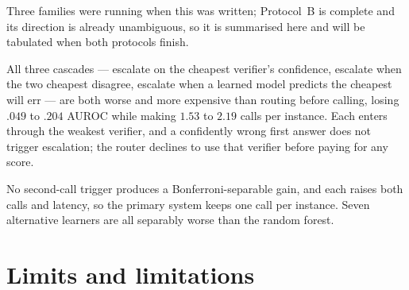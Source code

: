 \documentclass[10pt,a4paper]{article}
\begin{document}
Three families were running when this was written; Protocol~B is complete and its direction is
already unambiguous, so it is summarised here and will be tabulated when both protocols finish.

All three cascades --- escalate on the cheapest verifier's confidence, escalate when the two
cheapest disagree, escalate when a learned model predicts the cheapest will err --- are both
worse and more expensive than routing before calling, losing $.049$ to $.204$ AUROC while making
$1.53$ to $2.19$ calls per instance. Each enters through the weakest verifier, and a confidently
wrong first answer does not trigger escalation; the router declines to use that verifier before
paying for any score.

No second-call trigger produces a Bonferroni-separable gain, and each raises both calls and
latency, so the primary system keeps one call per instance. Seven alternative learners are all
separably worse than the random forest.

\section{Limits and limitations}
\end{document}

